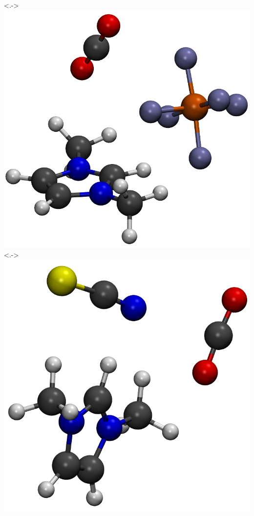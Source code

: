 \documentclass{beamer}
\begin{document}
\begin{frame}
\begin{columns}
    \uncover<.->{\includegraphics[scale=0.08]{./figures/cluster_PF6.png}}
    \uncover<.->{\includegraphics[scale=0.08]{./figures/cluster_SCN.png}}

\end{columns}
\end{frame}
\end{document}
